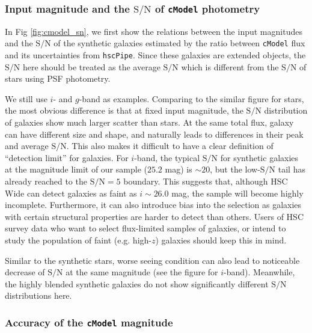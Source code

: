 \documentclass[useamsfonts]{pasj01}
\def\hscpipe{\texttt{hscPipe}}
\def\cmodel{\texttt{cModel}}
\def\s2n{{$\mathrm{S}/\mathrm{N}$}}
\begin{document}
\subsubsection{Input magnitude and the \s2n{} of \cmodel{} photometry}

    In Fig \ref{fig:cmodel_sn}, we first show the relations between the input 
    magnitudes and the \s2n{} of the synthetic galaxies estimated by the ratio 
    between \cmodel{} flux and its uncertainties from \hscpipe{}. 
    Since these galaxies are extended objects, the \s2n{} here should be treated 
    as the average \s2n{} which is different from the \s2n{} of stars using PSF 
    photometry. 
    
    We still use $i$- and $g$-band as examples. 
    Comparing to the similar figure for stars, the most obvious difference is that
    at fixed input magnitude, the \s2n{} distribution of galaxies show much larger
    scatter than stars.  
    At the same total flux, galaxy can have different size and shape, and 
    naturally leads to differences in their peak and average \s2n{}.  
    This also makes it difficult to have a clear definition of ``detection limit'' 
    for galaxies. 
    For $i$-band, the typical \s2n{} for synthetic galaxies at the magnitude limit 
    of our sample ($25.2$ mag) is ${\sim}20$, but the low-\s2n{} tail has already 
    reached to the \s2n{}$=5$ boundary.  
    This suggests that, although HSC Wide can detect galaxies as faint as 
    $i{\sim}26.0$ mag, the sample will become highly incomplete. 
    Furthermore, it can also introduce bias into the selection as galaxies with 
    certain structural properties are harder to detect than others. 
    Users of HSC survey data who want to select flux-limited samples of galaxies,
    or intend to study the population of faint (e.g. high-$z$) galaxies should
    keep this in mind.  
    
    Similar to the synthetic stars, worse seeing condition can also lead to 
    noticeable decrease of \s2n{} at the same magnitude (see the figure for
    $i$-band). 
    Meanwhile, the highly blended synthetic galaxies do not show significantly 
    different \s2n{} distributions here. 

\subsubsection{Accuracy of the \cmodel{} magnitude}
\end{document}
